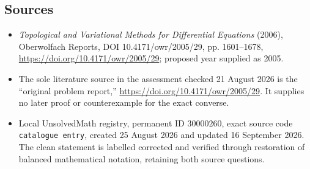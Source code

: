 \documentclass[11pt]{article}
\begin{document}
\subsection{Sources}
\begin{itemize}
\item \emph{Topological and Variational Methods for Differential Equations} (2006), Oberwolfach Reports, DOI 10.4171/owr/2005/29, pp. 1601--1678, \url{https://doi.org/10.4171/owr/2005/29}; proposed year supplied as 2005.
\item The sole literature source in the assessment checked 21 August 2026 is the ``original problem report,'' \url{https://doi.org/10.4171/owr/2005/29}. It supplies no later proof or counterexample for the exact converse.
\item Local UnsolvedMath registry, permanent ID $30000260$, exact source code \texttt{catalogue entry}, created 25 August 2026 and updated 16 September 2026. The clean statement is labelled corrected and verified through restoration of balanced mathematical notation, retaining both source questions.
\end{itemize}
\end{document}

